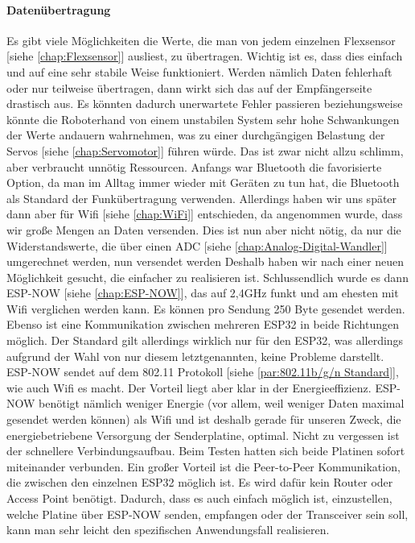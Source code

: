 \documentclass[titlepage,12pt,twoside]{article}
\begin{document}
\paragraph{Datenübertragung}
\label{par:Datenübertragung}
\hfill \break
\hfill \break
Es gibt viele Möglichkeiten die Werte, die man von jedem einzelnen Flexsensor [siehe \textcolor{blue}{\autoref{chap:Flexsensor}}] ausliest, zu übertragen. Wichtig ist es, dass 
dies einfach und auf eine sehr stabile Weise funktioniert. Werden nämlich Daten fehlerhaft oder nur teilweise übertragen, dann 
wirkt sich das auf der Empfängerseite drastisch aus. Es könnten dadurch unerwartete Fehler passieren beziehungsweise könnte die 
Roboterhand von einem unstabilen System sehr hohe Schwankungen der Werte andauern wahrnehmen, was zu einer durchgängigen 
Belastung der Servos [siehe \textcolor{blue}{\autoref{chap:Servomotor}}] führen würde. Das ist zwar nicht allzu schlimm, aber verbraucht unnötig Ressourcen. Anfangs war Bluetooth 
die favorisierte Option, da man im Alltag immer wieder mit Geräten zu tun hat, die Bluetooth als Standard der Funkübertragung 
verwenden. Allerdings haben wir uns später dann aber für Wifi [siehe \textcolor{blue}{\autoref{chap:WiFi}}] entschieden, da angenommen wurde, dass wir große Mengen an Daten 
versenden. Dies ist nun aber nicht nötig, da nur die Widerstandswerte, die über einen ADC [siehe \textcolor{blue}{\autoref{chap:Analog-Digital-Wandler}}] umgerechnet werden, nun versendet 
werden Deshalb haben wir nach einer neuen Möglichkeit gesucht, die einfacher zu realisieren ist. Schlussendlich wurde es dann 
ESP-NOW [siehe \textcolor{blue}{\autoref{chap:ESP-NOW}}], das auf 2,4GHz funkt und am ehesten mit Wifi verglichen werden kann. Es können pro Sendung 250 Byte gesendet werden. 
Ebenso ist eine Kommunikation zwischen mehreren ESP32 in beide Richtungen möglich. Der Standard gilt allerdings wirklich nur 
für den ESP32, was allerdings aufgrund der Wahl von nur diesem letztgenannten, keine Probleme darstellt. ESP-NOW sendet auf dem 
802.11 Protokoll [siehe \textcolor{blue}{\autoref{par:802.11b/g/n Standard}}], wie auch Wifi es macht. Der Vorteil liegt aber klar in der Energieeffizienz. ESP-NOW benötigt nämlich weniger 
Energie (vor allem, weil weniger Daten maximal gesendet werden können) als Wifi und ist deshalb gerade für unseren Zweck, die 
energiebetriebene Versorgung der Senderplatine, optimal. Nicht zu vergessen ist der schnellere Verbindungsaufbau. Beim Testen 
hatten sich beide Platinen sofort miteinander verbunden. Ein großer Vorteil ist die Peer-to-Peer Kommunikation, die zwischen 
den einzelnen ESP32 möglich ist. Es wird dafür kein Router oder Access Point benötigt. Dadurch, dass es auch einfach möglich 
ist, einzustellen, welche Platine über ESP-NOW senden, empfangen oder der Transceiver sein soll, kann man sehr leicht den 
spezifischen Anwendungsfall realisieren. \\
\\
\newpage
\end{document}
